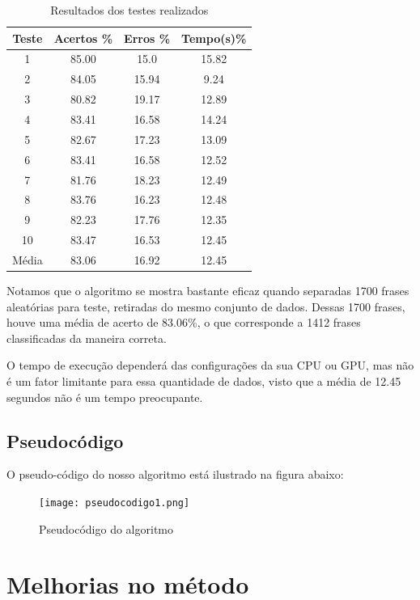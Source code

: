 \documentclass[
article,			%
12pt,				%
a4paper,			%
english,			%
brazil,				%
sumario=tradicional,
twoside
]{abntex2}
\begin{document}
		\begin{table}[!h]
			\caption{Resultados dos testes realizados}
			\label{tab: testes}
			\centering
			
			\begin{tabular}{|c|c|c|c|} \hline
				\textbf{Teste} & \textbf{Acertos \%} & \textbf{Erros \%} & \textbf{Tempo(s)\%} \\
				\hline
				1 & 85.00 & 15.0 & 15.82\\
				2 & 84.05 & 15.94 & 9.24 \\
				3 & 80.82 & 19.17 & 12.89 \\
				4 & 83.41 & 16.58 & 14.24\\
				5 & 82.67 & 17.23 & 13.09 \\
				6 & 83.41 & 16.58 & 12.52\\
				7 & 81.76 & 18.23 & 12.49\\
				8 & 83.76 & 16.23 & 12.48\\
				9 & 82.23 & 17.76 & 12.35\\
				10 & 83.47 & 16.53 & 12.45\\
				\hline
				Média & 83.06  &  16.92  & 12.45 \\
				\hline
				
			\end{tabular}
			
		\end{table}
		
		Notamos que o algoritmo se mostra bastante eficaz quando separadas 1700 frases aleatórias para teste, retiradas do mesmo conjunto de dados. Dessas 1700 frases, houve uma média de acerto de 83.06\%, o que corresponde a 1412 frases classificadas da maneira correta.
		
		O tempo de execução dependerá das configurações da sua CPU ou GPU, mas não é um fator limitante para essa quantidade de dados, visto que a média de 12.45 segundos não é um tempo preocupante.
		
		\subsection{Pseudocódigo}
		O pseudo-código do nosso algoritmo está ilustrado na figura abaixo:
		\begin{figure}[h!]
			\centering
			\caption{Pseudocódigo do algoritmo}
			\texttt{[image: pseudocodigo1.png]}
			\label{fig: pseudocodigo}
		\end{figure}
		
		
	\section{Melhorias no método}
	\label{melhorias}
\end{document}
